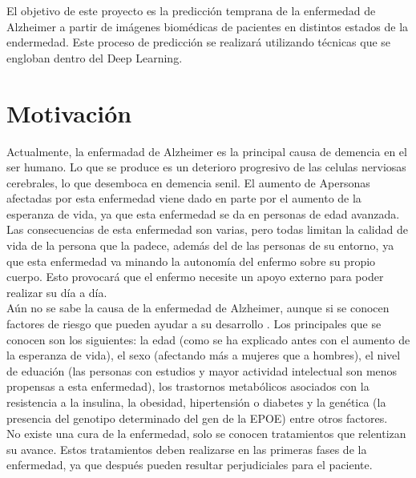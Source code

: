 
El objetivo de este proyecto es la predicción temprana de la enfermedad de Alzheimer a partir de imágenes biomédicas de pacientes en distintos estados de la endermedad. Este proceso de predicción se realizará utilizando técnicas que se engloban dentro del Deep Learning.

\section{Motivación}

Actualmente, la enfermadad de Alzheimer es la principal causa de demencia en el ser humano. Lo que se produce es un deterioro progresivo de las celulas nerviosas cerebrales, lo que desemboca en demencia senil. El aumento de Apersonas afectadas por esta enfermedad viene dado en parte por el aumento de la esperanza de vida, ya que esta enfermedad se da en personas de edad avanzada. Las consecuencias de esta enfermedad son varias, pero todas limitan la calidad de vida de la persona que la padece, además del de las personas de su entorno, ya que esta enfermedad va minando la autonomía del enfermo sobre su propio cuerpo. Esto provocará que el enfermo necesite un apoyo externo para poder realizar su día a día.\\

Aún no se sabe la causa de la enfermedad de Alzheimer, aunque si se conocen factores de riesgo que pueden ayudar a su desarrollo \cite{RiskFactors}. Los principales que se conocen son los siguientes: la edad (como se ha explicado antes con el aumento de la esperanza de vida), el sexo (afectando más a mujeres que a hombres), el nivel de eduación (las personas con estudios y mayor actividad intelectual son menos propensas a esta enfermedad), los trastornos metabólicos asociados con la resistencia a la insulina, la obesidad, hipertensión o diabetes y la genética (la presencia del genotipo determinado del gen de la EPOE) entre otros factores.\\
No existe una cura de la enfermedad, solo se conocen tratamientos que relentizan su avance. Estos tratamientos deben realizarse en las primeras fases de la enfermedad, ya que después pueden resultar perjudiciales para el paciente.\\


